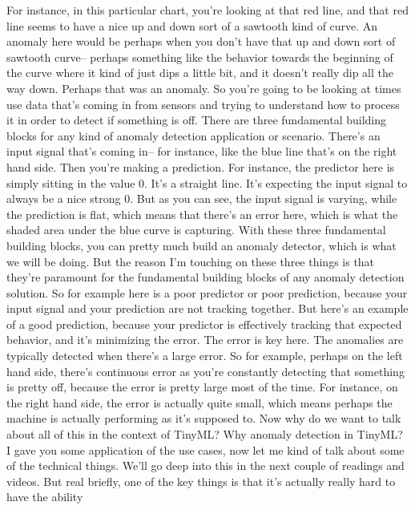   For instance, in this particular chart, you're looking at that red line,
  and that red line seems to have a nice up and down
  sort of a sawtooth kind of curve.
  An anomaly here would be perhaps when you don't have that up and down sort
  of sawtooth curve--
  perhaps something like the behavior towards the beginning of the curve
  where it kind of just dips a little bit, and it doesn't really
  dip all the way down.
  Perhaps that was an anomaly.
  So you're going to be looking at times use data that's coming in from sensors
  and trying to understand how to process it
  in order to detect if something is off.
  There are three fundamental building blocks
  for any kind of anomaly detection application or scenario.
  There's an input signal that's coming in--
  for instance, like the blue line that's on the right hand side.
  Then you're making a prediction.
  For instance, the predictor here is simply sitting in the value 0.
  It's a straight line.
  It's expecting the input signal to always be a nice strong 0.
  But as you can see, the input signal is varying, while the prediction is flat,
  which means that there's an error here, which
  is what the shaded area under the blue curve is capturing.
  With these three fundamental building blocks,
  you can pretty much build an anomaly detector,
  which is what we will be doing.
  But the reason I'm touching on these three things
  is that they're paramount for the fundamental building blocks
  of any anomaly detection solution.
  So for example here is a poor predictor or poor prediction,
  because your input signal and your prediction are not tracking together.
  But here's an example of a good prediction,
  because your predictor is effectively tracking that expected behavior,
  and it's minimizing the error.
  The error is key here.
  The anomalies are typically detected when there's a large error.
  So for example, perhaps on the left hand side,
  there's continuous error as you're constantly
  detecting that something is pretty off, because the error is pretty large most
  of the time.
  For instance, on the right hand side, the error
  is actually quite small, which means perhaps the machine is actually
  performing as it's supposed to.
  Now why do we want to talk about all of this in the context of TinyML?
  Why anomaly detection in TinyML?
  I gave you some application of the use cases,
  now let me kind of talk about some of the technical things.
  We'll go deep into this in the next couple of readings and videos.
  But real briefly, one of the key things is
  that it's actually really hard to have the ability

